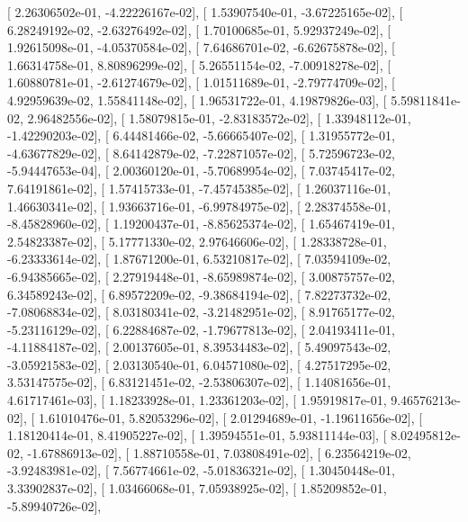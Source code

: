 \documentclass{article}
\begin{document}
       [  2.26306502e-01,  -4.22226167e-02],
       [  1.53907540e-01,  -3.67225165e-02],
       [  6.28249192e-02,  -2.63276492e-02],
       [  1.70100685e-01,   5.92937249e-02],
       [  1.92615098e-01,  -4.05370584e-02],
       [  7.64686701e-02,  -6.62675878e-02],
       [  1.66314758e-01,   8.80896299e-02],
       [  5.26551154e-02,  -7.00918278e-02],
       [  1.60880781e-01,  -2.61274679e-02],
       [  1.01511689e-01,  -2.79774709e-02],
       [  4.92959639e-02,   1.55841148e-02],
       [  1.96531722e-01,   4.19879826e-03],
       [  5.59811841e-02,   2.96482556e-02],
       [  1.58079815e-01,  -2.83183572e-02],
       [  1.33948112e-01,  -1.42290203e-02],
       [  6.44481466e-02,  -5.66665407e-02],
       [  1.31955772e-01,  -4.63677829e-02],
       [  8.64142879e-02,  -7.22871057e-02],
       [  5.72596723e-02,  -5.94447653e-04],
       [  2.00360120e-01,  -5.70689954e-02],
       [  7.03745417e-02,   7.64191861e-02],
       [  1.57415733e-01,  -7.45745385e-02],
       [  1.26037116e-01,   1.46630341e-02],
       [  1.93663716e-01,  -6.99784975e-02],
       [  2.28374558e-01,  -8.45828960e-02],
       [  1.19200437e-01,  -8.85625374e-02],
       [  1.65467419e-01,   2.54823387e-02],
       [  5.17771330e-02,   2.97646606e-02],
       [  1.28338728e-01,  -6.23333614e-02],
       [  1.87671200e-01,   6.53210817e-02],
       [  7.03594109e-02,  -6.94385665e-02],
       [  2.27919448e-01,  -8.65989874e-02],
       [  3.00875757e-02,   6.34589243e-02],
       [  6.89572209e-02,  -9.38684194e-02],
       [  7.82273732e-02,  -7.08068834e-02],
       [  8.03180341e-02,  -3.21482951e-02],
       [  8.91765177e-02,  -5.23116129e-02],
       [  6.22884687e-02,  -1.79677813e-02],
       [  2.04193411e-01,  -4.11884187e-02],
       [  2.00137605e-01,   8.39534483e-02],
       [  5.49097543e-02,  -3.05921583e-02],
       [  2.03130540e-01,   6.04571080e-02],
       [  4.27517295e-02,   3.53147575e-02],
       [  6.83121451e-02,  -2.53806307e-02],
       [  1.14081656e-01,   4.61717461e-03],
       [  1.18233928e-01,   1.23361203e-02],
       [  1.95919817e-01,   9.46576213e-02],
       [  1.61010476e-01,   5.82053296e-02],
       [  2.01294689e-01,  -1.19611656e-02],
       [  1.18120414e-01,   8.41905227e-02],
       [  1.39594551e-01,   5.93811144e-03],
       [  8.02495812e-02,  -1.67886913e-02],
       [  1.88710558e-01,   7.03808491e-02],
       [  6.23564219e-02,  -3.92483981e-02],
       [  7.56774661e-02,  -5.01836321e-02],
       [  1.30450448e-01,   3.33902837e-02],
       [  1.03466068e-01,   7.05938925e-02],
       [  1.85209852e-01,  -5.89940726e-02],
\end{document}
